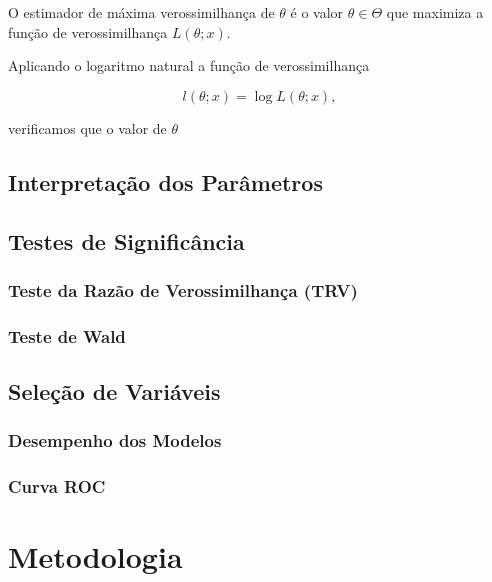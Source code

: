 \documentclass[
	12pt,				%
	openright,			%
	oneside,      %
	a4paper,			%
	english,			%
	french,				%
	spanish,			%
	brazil,				%
	]{abntex2}\usepackage[]{graphicx}\usepackage[table]{xcolor}
\theoremstyle{definition}
\begin{document}
O estimador de máxima verossimilhança de $\theta$ é o valor $\theta \in \Theta$ que maximiza a função de verossimilhança $L(\theta;x)$. 

Aplicando o logaritmo natural a função de verossimilhança

\begin{equation}
    l(\theta;x) = \log L(\theta;x),
\end{equation}

\noindent verificamos que o valor de $\theta$
    



    \section{Interpretação dos Parâmetros}






    \section{Testes de Significância}
      
      
      \subsection{Teste da Razão de Verossimilhança (TRV)}
        
        
      \subsection{Teste de Wald}





    \section{Seleção de Variáveis}




      \subsection{Desempenho dos Modelos}
      
      
       \subsection{Curva ROC}




\chapter{Metodologia}
\end{document}
